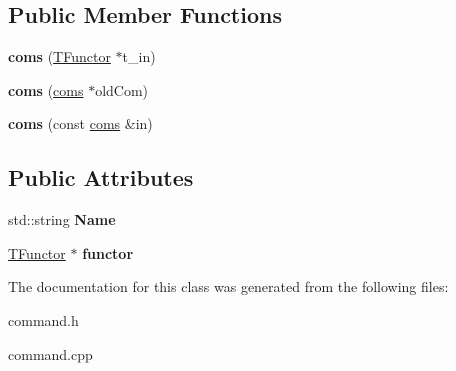 \subsection*{Public Member Functions}
\begin{DoxyCompactItemize}
\item 
{\bfseries coms} (\hyperlink{classTFunctor}{T\+Functor} $\ast$t\+\_\+in)\hypertarget{classcoms_a290eaf728c2d00a042515db0eb4240eb}{}\label{classcoms_a290eaf728c2d00a042515db0eb4240eb}

\item 
{\bfseries coms} (\hyperlink{classcoms}{coms} $\ast$old\+Com)\hypertarget{classcoms_a7ebfe370d34543cb07e57babf54f2913}{}\label{classcoms_a7ebfe370d34543cb07e57babf54f2913}

\item 
{\bfseries coms} (const \hyperlink{classcoms}{coms} \&in)\hypertarget{classcoms_a00d8f560c1752b5fdd1063a8fdd1f7f9}{}\label{classcoms_a00d8f560c1752b5fdd1063a8fdd1f7f9}

\end{DoxyCompactItemize}
\subsection*{Public Attributes}
\begin{DoxyCompactItemize}
\item 
std\+::string {\bfseries Name}\hypertarget{classcoms_ad0d0eda55216a924aabcec95a2ab409a}{}\label{classcoms_ad0d0eda55216a924aabcec95a2ab409a}

\item 
\hyperlink{classTFunctor}{T\+Functor} $\ast$ {\bfseries functor}\hypertarget{classcoms_a54f1040ecdd8fa4ae6484e3c1e0a356d}{}\label{classcoms_a54f1040ecdd8fa4ae6484e3c1e0a356d}

\end{DoxyCompactItemize}


The documentation for this class was generated from the following files\+:\begin{DoxyCompactItemize}
\item 
command.\+h\item 
command.\+cpp\end{DoxyCompactItemize}
